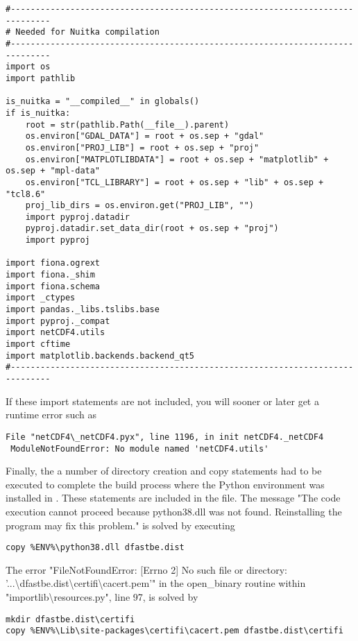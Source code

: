 \begin{Verbatim}
#------------------------------------------------------------------------------
# Needed for Nuitka compilation
#------------------------------------------------------------------------------
import os
import pathlib

is_nuitka = "__compiled__" in globals()
if is_nuitka:
    root = str(pathlib.Path(__file__).parent)
    os.environ["GDAL_DATA"] = root + os.sep + "gdal"
    os.environ["PROJ_LIB"] = root + os.sep + "proj"
    os.environ["MATPLOTLIBDATA"] = root + os.sep + "matplotlib" + os.sep + "mpl-data"
    os.environ["TCL_LIBRARY"] = root + os.sep + "lib" + os.sep + "tcl8.6"
    proj_lib_dirs = os.environ.get("PROJ_LIB", "")
    import pyproj.datadir
    pyproj.datadir.set_data_dir(root + os.sep + "proj")
    import pyproj

import fiona.ogrext
import fiona._shim
import fiona.schema
import _ctypes
import pandas._libs.tslibs.base
import pyproj._compat
import netCDF4.utils
import cftime
import matplotlib.backends.backend_qt5
#------------------------------------------------------------------------------
\end{Verbatim}

If these import statements are not included, you will sooner or later get a runtime error such as

\begin{Verbatim}
File "netCDF4\_netCDF4.pyx", line 1196, in init netCDF4._netCDF4
 ModuleNotFoundError: No module named 'netCDF4.utils'
\end{Verbatim}

Finally, the a number of directory creation and copy statements had to be executed to complete the build process where the Python environment was installed in .
These statements are included in the  file.
The message "The code execution cannot proceed because python38.dll was not found. Reinstalling the program may fix this problem." is solved by executing

\begin{Verbatim}
copy %ENV%\python38.dll dfastbe.dist
\end{Verbatim}

The error "FileNotFoundError: [Errno 2] No such file or directory: '...\textbackslash{}dfastbe.dist\textbackslash{}certifi\textbackslash{}cacert.pem'" in the open\_binary routine within "importlib\textbackslash{}resources.py", line 97, is solved by

\begin{Verbatim}
mkdir dfastbe.dist\certifi
copy %ENV%\Lib\site-packages\certifi\cacert.pem dfastbe.dist\certifi
\end{Verbatim}

